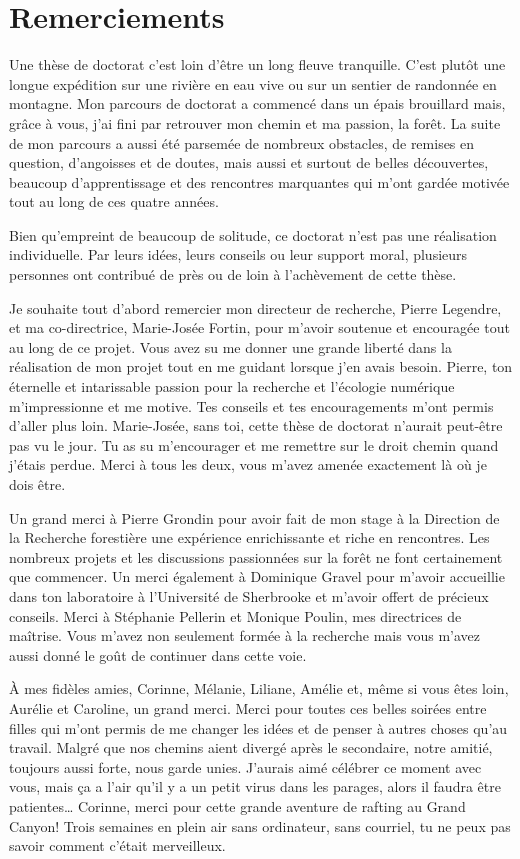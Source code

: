 \francais

\chapter*{Remerciements}

Une thèse de doctorat c'est loin d'être un long fleuve tranquille. C'est
plutôt une longue expédition sur une rivière en eau vive ou sur un
sentier de randonnée en montagne. Mon parcours de doctorat a commencé
dans un épais brouillard mais, grâce à vous, j'ai fini par retrouver mon
chemin et ma passion, la forêt. La suite de mon parcours a aussi été
parsemée de nombreux obstacles, de remises en question, d'angoisses et
de doutes, mais aussi et surtout de belles découvertes, beaucoup
d'apprentissage et des rencontres marquantes qui m'ont gardée motivée
tout au long de ces quatre années.

Bien qu'empreint de beaucoup de solitude, ce doctorat n'est pas une
réalisation individuelle. Par leurs idées, leurs conseils ou leur
support moral, plusieurs personnes ont contribué de près ou de loin à
l'achèvement de cette thèse.

Je souhaite tout d'abord remercier mon directeur de recherche, Pierre
Legendre, et ma co-directrice, Marie-Josée Fortin, pour m'avoir soutenue
et encouragée tout au long de ce projet. Vous avez su me donner une
grande liberté dans la réalisation de mon projet tout en me guidant
lorsque j'en avais besoin. Pierre, ton éternelle et intarissable passion
pour la recherche et l'écologie numérique m'impressionne et me motive.
Tes conseils et tes encouragements m'ont permis d'aller plus loin.
Marie-Josée, sans toi, cette thèse de doctorat n'aurait peut-être pas vu
le jour. Tu as su m'encourager et me remettre sur le droit chemin quand
j'étais perdue. Merci à tous les deux, vous m'avez amenée exactement là
où je dois être.

Un grand merci à Pierre Grondin pour avoir fait de mon stage à la
Direction de la Recherche forestière une expérience enrichissante et
riche en rencontres. Les nombreux projets et les discussions passionnées
sur la forêt ne font certainement que commencer. Un merci également à
Dominique Gravel pour m'avoir accueillie dans ton laboratoire à
l'Université de Sherbrooke et m'avoir offert de précieux conseils. Merci
à Stéphanie Pellerin et Monique Poulin, mes directrices de maîtrise.
Vous m'avez non seulement formée à la recherche mais vous m'avez aussi
donné le goût de continuer dans cette voie.

À mes fidèles amies, Corinne, Mélanie, Liliane, Amélie et, même si vous
êtes loin, Aurélie et Caroline, un grand merci. Merci pour toutes ces
belles soirées entre filles qui m'ont permis de me changer les idées et
de penser à autres choses qu'au travail. Malgré que nos chemins aient
divergé après le secondaire, notre amitié, toujours aussi forte, nous
garde unies. J'aurais aimé célébrer ce moment avec vous, mais ça a l'air
qu'il y a un petit virus dans les parages, alors il faudra être
patientes\ldots{} Corinne, merci pour cette grande aventure de rafting
au Grand Canyon! Trois semaines en plein air sans ordinateur, sans
courriel, tu ne peux pas savoir comment c'était merveilleux.

